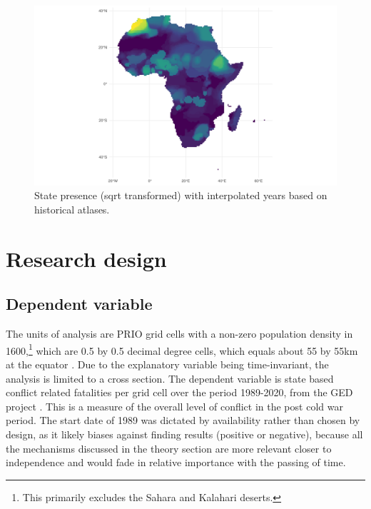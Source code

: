 \documentclass[12pt]{article}
\begin{document}

\begin{figure}[htpb]
	\centering
	\includegraphics[width=\linewidth]{../R/Output/sqrtSpAll.pdf}
	\caption{State presence (sqrt transformed) with interpolated years based
	on historical atlases.}
	\label{Sp_i}
\end{figure}


\section{Research design}

\subsection{Dependent variable}

The units of analysis are PRIO grid cells with a non-zero population density in
1600,\footnote{This primarily excludes the Sahara and Kalahari deserts.} which
are 0.5 by 0.5 decimal degree cells, which equals about 55 by 55km at the
equator \citep{Tollefsen2012}. Due to the explanatory variable being
time-invariant, the analysis is limited to a cross section. The dependent
variable is state based conflict related fatalities per grid cell over the
period 1989-2020, from the GED project \citep{Sundberg2013}. This is a measure
of the overall level of conflict in the post cold war period. The start date of
1989 was dictated by availability rather than chosen by design, as it likely
biases against finding results (positive or negative), because all the
mechanisms discussed in the theory section are more relevant closer to
independence and would fade in relative importance with the passing of time.
\end{document}
